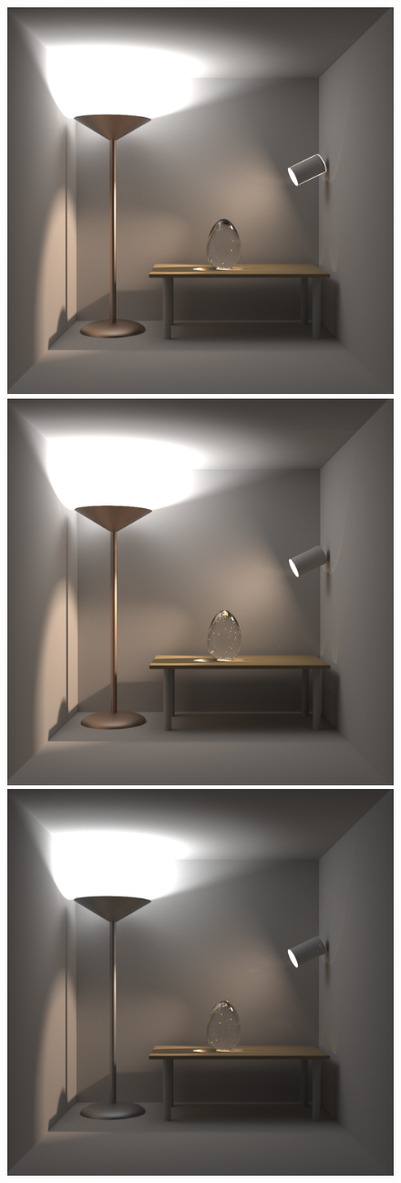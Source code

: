 \begin{figure}
\centering
\includegraphics[width=0.325\linewidth]{figs/4_results/veach-bidir/1_from_mitsuba.png}
\includegraphics[width=0.325\linewidth]{figs/4_results/veach-bidir/2_to_pbrt.png}
\includegraphics[width=0.325\linewidth]{figs/4_results/veach-bidir/3_to_lux.png}
\end{figure}
